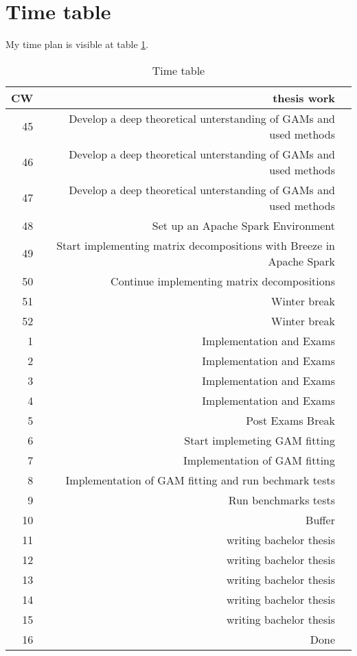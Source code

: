 \documentclass{article}
\begin{document}
    \section{Time table}
    My time plan is visible at table \ref{timetable}.
    \begin{table}[h]
        \begin{center}
        \caption{Time table} %
        \label{timetable}
        \begin{tabular}{rrl}
            \toprule
            CW & thesis work \\
            \midrule
            45  & Develop a deep theoretical unterstanding of GAMs and used methods \\
            46  & Develop a deep theoretical unterstanding of GAMs and used methods \\
            47  & Develop a deep theoretical unterstanding of GAMs and used methods \\
            48  & Set up an Apache Spark Environment \\
            49  & Start implementing matrix decompositions with Breeze in Apache Spark \\
            50  & Continue implementing matrix decompositions \\
            51  & Winter break \\
            52  & Winter break \\
            1  & Implementation and Exams \\
            2  & Implementation and Exams \\
            3  & Implementation and Exams \\
            4  & Implementation and Exams \\
            5  & Post Exams Break \\
            6  & Start implemeting GAM fitting \\
            7  & Implementation of GAM fitting \\
            8  & Implementation of GAM fitting and run bechmark tests \\
            9  & Run benchmarks tests  \\
            10  & Buffer \\
            11  & writing bachelor thesis\\
            12  & writing bachelor thesis\\
            13  & writing bachelor thesis\\
            14  & writing bachelor thesis\\
            15  & writing bachelor thesis\\
            16  & Done \\



        \end{tabular}
        \end{center}
    \end{table}
    \newpage


    \newpage
\end{document}
